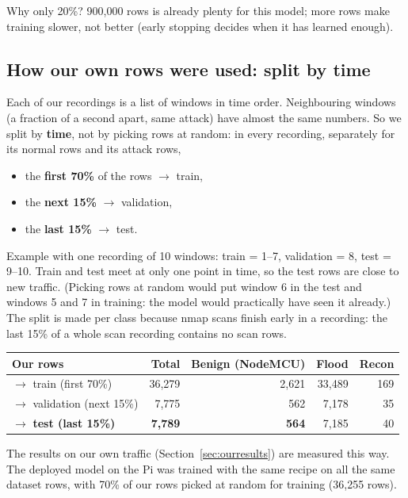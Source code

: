 \documentclass[11pt,a4paper]{article}
\newcommand{\tablestart}{\Needspace{8\baselineskip}}
\begin{document}
Why only 20\%? 900,000 rows is already plenty for this model; more rows make training slower, not better
(early stopping decides when it has learned enough).

\subsection{How our own rows were used: split by time}\label{sec:timesplit}

Each of our recordings is a list of windows in time order. Neighbouring windows (a fraction of a second apart, same
attack) have almost the same numbers. So we split by \textbf{time}, not by picking rows at random: in every
recording, separately for its normal rows and its attack rows,

\begin{itemize}
  \item the \textbf{first 70\%} of the rows $\rightarrow$ train,
  \item the \textbf{next 15\%} $\rightarrow$ validation,
  \item the \textbf{last 15\%} $\rightarrow$ test.
\end{itemize}

Example with one recording of 10 windows: train = 1--7, validation = 8, test = 9--10. Train and test meet at only
one point in time, so the test rows are close to new traffic. (Picking rows at random would put window 6 in the
test and windows 5 and 7 in training: the model would practically have seen it already.) The split is made per
class because nmap scans finish early in a recording: the last 15\% of a whole scan recording contains no scan rows.

\tablestart
\begin{center}
\begin{tabular}{lrrrr}
\toprule
Our rows & Total & Benign (NodeMCU) & Flood & Recon \\
\midrule
$\rightarrow$ train (first 70\%) & 36,279 & 2,621 & 33,489 & 169 \\
$\rightarrow$ validation (next 15\%) & 7,775 & 562 & 7,178 & 35 \\
$\rightarrow$ \textbf{test (last 15\%)} & \textbf{7,789} & \textbf{564} & 7,185 & 40 \\
\bottomrule
\end{tabular}
\end{center}

The results on our own traffic (Section~\ref{sec:ourresults}) are measured this way. The deployed model on the Pi
was trained with the same recipe on all the same dataset rows, with 70\% of our rows picked at random for training
(36,255 rows).
\end{document}
